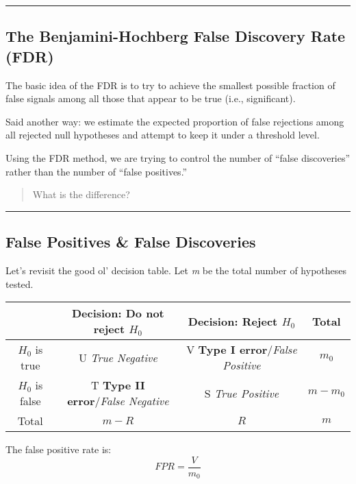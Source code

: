 \documentclass[]{article}
\begin{document}
\begin{center}\rule{0.5\linewidth}{\linethickness}\end{center}

\hypertarget{the-benjamini-hochberg-false-discovery-rate-fdr}{%
\subsection{The Benjamini-Hochberg False Discovery Rate
(FDR)}\label{the-benjamini-hochberg-false-discovery-rate-fdr}}

The basic idea of the FDR is to try to achieve the smallest possible
fraction of false signals among all those that appear to be true (i.e.,
significant).

Said another way: we estimate the expected proportion of false
rejections among all rejected null hypotheses and attempt to keep it
under a threshold level.

Using the FDR method, we are trying to control the number of ``false
discoveries'' rather than the number of ``false positives.''

\begin{quote}
What is the difference?
\end{quote}

\begin{center}\rule{0.5\linewidth}{\linethickness}\end{center}

\hypertarget{false-positives-false-discoveries}{%
\subsection{False Positives \& False
Discoveries}\label{false-positives-false-discoveries}}

Let's revisit the good ol' decision table. Let \emph{m} be the total
number of hypotheses tested.

\begin{longtable}[]{@{}cccc@{}}
\toprule
& Decision: Do not reject \(H_0\) & Decision: Reject \(H_0\) &
Total\tabularnewline
\midrule
\endhead
\(H_0\) is true & U \emph{True Negative} & V \textbf{Type I
error}/\emph{False Positive} & \(m_0\)\tabularnewline
\(H_0\) is false & T \textbf{Type II error}/\emph{False Negative} & S
\emph{True Positive} & \(m-m_0\)\tabularnewline
Total & \(m-R\) & \(R\) & \(m\)\tabularnewline
\bottomrule
\end{longtable}

The false positive rate is: \[FPR=\frac{V}{m_0}\]
\end{document}
